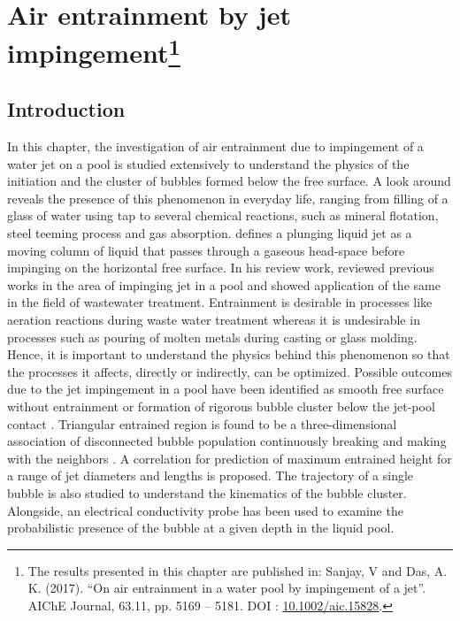\chapter[Air entrainment by impingement of liquid jet on a pool]{Air entrainment by jet impingement\footnote{The results presented in this chapter are published in: Sanjay, V and Das, A. K. (2017). \textquotedblleft On air entrainment in a water pool by impingement of a jet\textquotedblright. AIChE Journal, 63.11, pp. 5169 -- 5181. DOI : \href{https://onlinelibrary.wiley.com/doi/abs/10.1002/aic.15828}{\color{black}10.1002/aic.15828}.}}\label{Chapter::BubbleEntrainment}
\section{Introduction}
In this chapter, the investigation of air entrainment due to impingement of a water jet on a pool is studied extensively to understand the physics of the initiation and the cluster of bubbles formed below the free surface. A look around reveals the presence of this phenomenon in everyday life, ranging from filling of a glass of water using tap to several chemical reactions, such as mineral flotation, steel teeming process and gas absorption. \citet{Evans1996} defines a plunging liquid jet as a moving column of liquid that passes through a gaseous head-space before impinging on the horizontal free surface. In his review work, \citet{Bin1993} reviewed previous works in the area of impinging jet in a pool and showed application of the same in the field of wastewater treatment. Entrainment is desirable in processes like aeration reactions during waste water treatment whereas it is undesirable in processes such as pouring of molten metals during casting or glass molding. Hence, it is important to understand the physics behind this phenomenon so that the processes it affects, directly or indirectly, can be optimized. Possible outcomes due to the jet impingement in a pool have been identified as smooth free surface without entrainment or formation of rigorous bubble cluster below the jet-pool contact \citep{Roy2013}. Triangular entrained region is found to be a three-dimensional association of disconnected bubble population continuously breaking and making with the neighbors \citep{Belden2012,Harby2014,Bagatur2014}. A correlation for prediction of maximum entrained height for a range of jet diameters and lengths is proposed. The trajectory of a single bubble is also studied to understand the kinematics of the bubble cluster. Alongside, an electrical conductivity probe has been used to examine the probabilistic presence of the bubble at a given depth in the liquid pool. 
